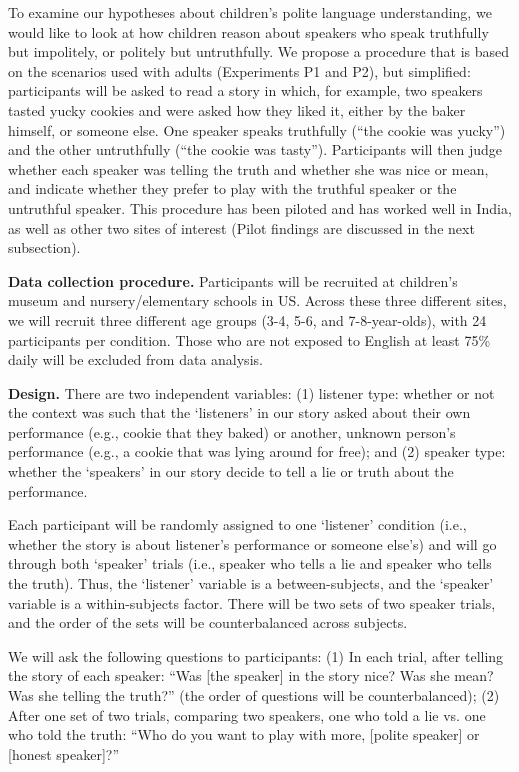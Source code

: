 To examine our hypotheses about children's polite language understanding, we would like to look at how children reason about speakers who speak truthfully but impolitely, or politely but untruthfully. We propose a procedure that is based on the scenarios used with adults (Experiments P1 and P2), but simplified: participants will be asked to read a story in which, for example, two speakers tasted yucky cookies and were asked how they liked it, either by the baker himself, or someone else. One speaker speaks truthfully (``the cookie was yucky'') and the other untruthfully (``the cookie was tasty''). Participants will then judge whether each speaker was telling the truth and whether she was nice or mean, and indicate whether they prefer to play with the truthful speaker or the untruthful speaker. This procedure has been piloted and has worked well in India, as well as other two sites of interest (Pilot findings are discussed in the next subsection).
 
{\bf Data collection procedure.} Participants will be recruited at children's museum and nursery/elementary schools in US. Across these three different sites, we will recruit three different age groups (3-4, 5-6, and 7-8-year-olds), with 24 participants per condition. Those who are not exposed to English at least 75\% daily will be excluded from data analysis. 

{\bf Design.} There are two independent variables: (1) listener type: whether or not the context was such that the `listeners' in our story asked about their own performance (e.g., cookie that they baked) or another, unknown person's performance (e.g., a cookie that was lying around for free); and (2) speaker type: whether the `speakers' in our story decide to tell a lie or truth about the performance. 

Each participant will be randomly assigned to one `listener' condition (i.e., whether the story is about listener's performance or someone else's) and will go through both `speaker' trials (i.e., speaker who tells a lie and speaker who tells the truth). Thus, the `listener' variable is a between-subjects, and the `speaker' variable is a within-subjects factor. There will be two sets of two speaker trials, and the order of the sets will be counterbalanced across subjects.

We will ask the following questions to participants: (1) In each trial, after telling the story of each speaker: ``Was [the speaker] in the story nice? Was she mean? Was she telling the truth?'' (the order of questions will be counterbalanced); (2) After one set of two trials, comparing two speakers, one who told a lie vs. one who told the truth: ``Who do you want to play with more, [polite speaker] or [honest speaker]?''

